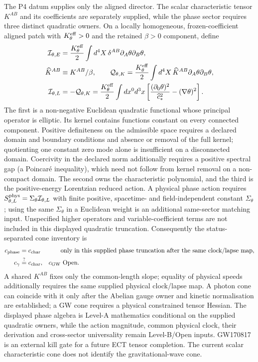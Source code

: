 \documentclass[11pt,a4paper]{article}
\begin{document}
The P4 datum supplies only the aligned director.  The scalar characteristic tensor $K^{AB}$ and its coefficients are separately supplied, while the phase sector requires three distinct quadratic owners.  On a locally homogeneous, frozen-coefficient aligned patch with $K_\theta^{\rm eff}>0$ and the retained $\beta>0$ component, define
\begin{align*}
 \mathcal I_{\theta,E}
 &=\frac{K_\theta^{\rm eff}}2\int d^4X\,
   \delta^{AB}\partial_A\theta\partial_B\theta,\\
 \widehat K^{AB}&\equiv K^{AB}/\beta,
 \qquad
 \mathcal Q_{\theta,K}
 =\frac{K_\theta^{\rm eff}}2\int d^4X\,
   \widehat K^{AB}\partial_A\theta\partial_B\theta,\\
 \mathcal I_{\theta,L}&=-\mathcal Q_{\theta,K}
 =\frac{K_\theta^{\rm eff}}2\int dx^0d^3x
 \left[\frac{(\partial_0\theta)^2}{\widehat c_*^2}
       -(\nabla\theta)^2\right].
\end{align*}
The first is a non-negative Euclidean quadratic functional whose principal operator is elliptic.  Its kernel contains functions constant on every connected component.  Positive definiteness on the admissible space requires a declared domain and boundary conditions and absence or removal of the full kernel; quotienting one constant zero mode alone is insufficient on a disconnected domain.  Coercivity in the declared norm additionally requires a positive spectral gap (a Poincar\'e inequality), which need not follow from kernel removal on a non-compact domain.  The second owns the characteristic polynomial, and the third is the positive-energy Lorentzian reduced action.  A physical phase action requires $S_{\theta,L}^{\rm phys}=\Sigma_\theta\mathcal I_{\theta,L}$ with finite positive, spacetime- and field-independent constant $\Sigma_\theta$; using the same $\Sigma_\theta$ in a Euclidean weight is an additional same-sector matching input.  Unspecified higher operators and variable-coefficient terms are not included in this displayed quadratic truncation.  Consequently the status-separated cone inventory is
\begin{equation}
  \begin{aligned}
  c_{\rm phase}&=c_{\rm char}
    &&\text{only in this supplied phase truncation after the same clock/lapse map},\\
  c_\gamma&\stackrel{?}{=}c_{\rm char},
    &c_{\rm GW}&\ \text{Open}.
  \end{aligned}
  \label{eq:pop_cone}
\end{equation}
A shared $K^{AB}$ fixes only the common-length slope; equality of physical speeds additionally requires the same supplied physical clock/lapse map.  A photon cone can coincide with it only after the Abelian gauge owner and kinetic normalisation are established; a GW cone requires a physical constrained tensor Hessian.  The displayed phase algebra is Level-A mathematics conditional on the supplied quadratic owners, while the action magnitude, common physical clock, their derivation and cross-sector universality remain Level-B/Open inputs.
GW170817 is an external kill gate for a future ECT tensor completion.  The current scalar characteristic cone does not identify the gravitational-wave cone.
\end{document}
